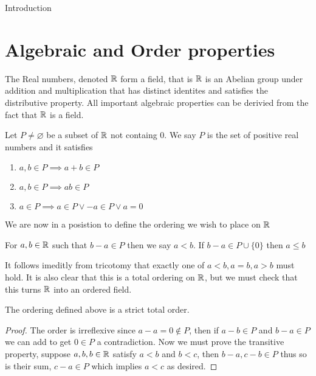 \begin{chapter}{Introduction}
    \section{Algebraic and Order properties}
    The Real numbers, denoted $\mathbb{R}$ form a field, that is $\mathbb{R}$ is an Abelian group under addition and multiplication that 
    has distinct identites and satisfies the distributive property. All important algebraic properties can be derivied from the fact 
    that $\mathbb{R}$ is a field. 

    
    \begin{defn}
        Let $P \neq \varnothing$ be a subset of $\mathbb{R}$ not containg $0$. We say $P$ is the set of positive real numbers and it satisfies 
        
        \begin{enumerate}
           \item  $a, b \in  P \implies a + b \in P$
           \item $a,b \in P \implies ab \in P$ 
           \item $a \in P \implies a \in P \vee -a \in P \vee  a = 0$
            
        \end{enumerate}
    \end{defn}

    We are now in a posistion to define the ordering we wish to place on $\mathbb{R}$ 

    
    \begin{defn}
        For $a, b \in \mathbb{R}$ such that $b - a \in P$ then we say $a < b$. 
        If $b -a \in P \cup \{0\}$ then $a \leq b$
    \end{defn}

    It follows imeditly from tricotomy that exactly one of $a < b, a = b, a > b$ must hold. 
    It is also clear that this is a total ordering on $\mathbb{R}$, but we must check that this turns $\mathbb{R}$ into an ordered field. 

    
    \begin{lem}
        The ordering defined above is a strict total order. 
    \end{lem}

    
    \begin{proof}
        The order is irreflexive since $a-a = 0 \notin P$, then if $a - b \in P$ and $b - a \in P$ we can add to get 
        $0 \in P$ a contradiction. Now we must prove the transitive property, suppose $a, b, b \in \mathbb{R}$ satisfy 
        $a < b $ and $b < c$, then $b - a, c - b \in P$ thus so is their sum, $c - a \in P$ which implies $a < c$ as desired. 
    \end{proof}


\end{chapter}

